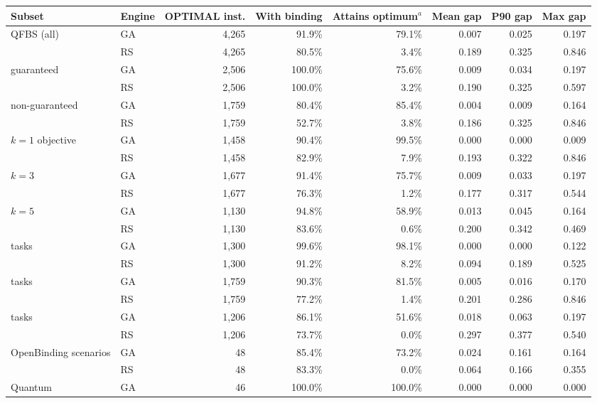 \begin{tabular}{llrrrrrr}
\toprule
Subset & Engine & OPTIMAL inst. & With binding & Attains optimum$^{a}$ & Mean gap & P90 gap & Max gap \\
\midrule
QFBS (all) & GA & 4,265 & 91.9\% & 79.1\% & 0.007 & 0.025 & 0.197 \\
 & RS & 4,265 & 80.5\% & 3.4\% & 0.189 & 0.325 & 0.846 \\
\addlinespace[2pt]
\quad guaranteed & GA & 2,506 & 100.0\% & 75.6\% & 0.009 & 0.034 & 0.197 \\
 & RS & 2,506 & 100.0\% & 3.2\% & 0.190 & 0.325 & 0.597 \\
\addlinespace[2pt]
\quad non-guaranteed & GA & 1,759 & 80.4\% & 85.4\% & 0.004 & 0.009 & 0.164 \\
 & RS & 1,759 & 52.7\% & 3.8\% & 0.186 & 0.325 & 0.846 \\
\addlinespace[2pt]
\quad $k=1$ objective & GA & 1,458 & 90.4\% & 99.5\% & 0.000 & 0.000 & 0.009 \\
 & RS & 1,458 & 82.9\% & 7.9\% & 0.193 & 0.322 & 0.846 \\
\addlinespace[2pt]
\quad $k=3$ & GA & 1,677 & 91.4\% & 75.7\% & 0.009 & 0.033 & 0.197 \\
 & RS & 1,677 & 76.3\% & 1.2\% & 0.177 & 0.317 & 0.544 \\
\addlinespace[2pt]
\quad $k=5$ & GA & 1,130 & 94.8\% & 58.9\% & 0.013 & 0.045 & 0.164 \\
 & RS & 1,130 & 83.6\% & 0.6\% & 0.200 & 0.342 & 0.469 \\
\addlinespace[2pt]
\quad 12 tasks & GA & 1,300 & 99.6\% & 98.1\% & 0.000 & 0.000 & 0.122 \\
 & RS & 1,300 & 91.2\% & 8.2\% & 0.094 & 0.189 & 0.525 \\
\addlinespace[2pt]
\quad 24 tasks & GA & 1,759 & 90.3\% & 81.5\% & 0.005 & 0.016 & 0.170 \\
 & RS & 1,759 & 77.2\% & 1.4\% & 0.201 & 0.286 & 0.846 \\
\addlinespace[2pt]
\quad 48 tasks & GA & 1,206 & 86.1\% & 51.6\% & 0.018 & 0.063 & 0.197 \\
 & RS & 1,206 & 73.7\% & 0.0\% & 0.297 & 0.377 & 0.540 \\
\addlinespace[2pt]
OpenBinding scenarios & GA & 48 & 85.4\% & 73.2\% & 0.024 & 0.161 & 0.164 \\
 & RS & 48 & 83.3\% & 0.0\% & 0.064 & 0.166 & 0.355 \\
\addlinespace[2pt]
Quantum & GA & 46 & 100.0\% & 100.0\% & 0.000 & 0.000 & 0.000 \\

\end{tabular}
